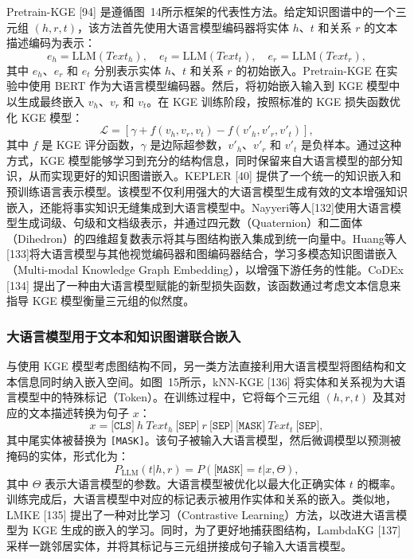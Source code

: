 \documentclass[11pt,UTF8,fontset=fandol]{ctexart}
\begin{document}
Pretrain-KGE [94] 是遵循图~14所示框架的代表性方法。给定知识图谱中的一个三元组 $(h, r, t)$，该方法首先使用大语言模型编码器将实体 $h$、$t$ 和关系 $r$ 的文本描述编码为表示：
\begin{equation}
e_h = \text{LLM}(Text_h),\quad e_t = \text{LLM}(Text_t),\quad e_r = \text{LLM}(Text_r), \tag{1}
\end{equation}
其中 $e_h$、$e_r$ 和 $e_t$ 分别表示实体 $h$、$t$ 和关系 $r$ 的初始嵌入。Pretrain-KGE 在实验中使用 BERT 作为大语言模型编码器。然后，将初始嵌入输入到 KGE 模型中以生成最终嵌入 $v_h$、$v_r$ 和 $v_t$。在 KGE 训练阶段，按照标准的 KGE 损失函数优化 KGE 模型：
\begin{equation}
\mathcal{L} = [\gamma + f(v_h, v_r, v_t) - f(v'_h, v'_r, v'_t)], \tag{2}
\end{equation}
其中 $f$ 是 KGE 评分函数，$\gamma$ 是边际超参数，$v'_h$、$v'_r$ 和 $v'_t$ 是负样本。通过这种方式，KGE 模型能够学习到充分的结构信息，同时保留来自大语言模型的部分知识，从而实现更好的知识图谱嵌入。KEPLER [40] 提供了一个统一的知识嵌入和预训练语言表示模型。该模型不仅利用强大的大语言模型生成有效的文本增强知识嵌入，还能将事实知识无缝集成到大语言模型中。Nayyeri等人[132]使用大语言模型生成词级、句级和文档级表示，并通过四元数（Quaternion）和二面体（Dihedron）的四维超复数表示将其与图结构嵌入集成到统一向量中。Huang等人[133]将大语言模型与其他视觉编码器和图编码器结合，学习多模态知识图谱嵌入（Multi-modal Knowledge Graph Embedding），以增强下游任务的性能。CoDEx [134] 提出了一种由大语言模型赋能的新型损失函数，该函数通过考虑文本信息来指导 KGE 模型衡量三元组的似然度。

\subsubsection{大语言模型用于文本和知识图谱联合嵌入}

与使用 KGE 模型考虑图结构不同，另一类方法直接利用大语言模型将图结构和文本信息同时纳入嵌入空间。如图~15所示，kNN-KGE [136] 将实体和关系视为大语言模型中的特殊标记（Token）。在训练过程中，它将每个三元组 $(h, r, t)$ 及其对应的文本描述转换为句子 $x$：
\begin{equation}
x = \texttt{[CLS]}\ h\ Text_h\ \texttt{[SEP]}\ r\ \texttt{[SEP]}\ \texttt{[MASK]}\ Text_t\ \texttt{[SEP]}, \tag{3}
\end{equation}
其中尾实体被替换为 \texttt{[MASK]}。该句子被输入大语言模型，然后微调模型以预测被掩码的实体，形式化为：
\begin{equation}
P_{\text{LLM}}(t|h,r) = P(\texttt{[MASK]}=t|x, \Theta), \tag{4}
\end{equation}
其中 $\Theta$ 表示大语言模型的参数。大语言模型被优化以最大化正确实体 $t$ 的概率。训练完成后，大语言模型中对应的标记表示被用作实体和关系的嵌入。类似地，LMKE [135] 提出了一种对比学习（Contrastive Learning）方法，以改进大语言模型为 KGE 生成的嵌入的学习。同时，为了更好地捕获图结构，LambdaKG [137] 采样一跳邻居实体，并将其标记与三元组拼接成句子输入大语言模型。
\end{document}
